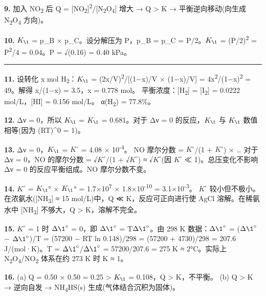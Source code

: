 \textbf{9.} 加入 NO\textsubscript{2} 后 Q = {[}NO\textsubscript{2}{]}\textsuperscript{2}/{[}N\textsubscript{2}O\textsubscript{4}{]} 增大 → Q \textgreater{} K → 平衡逆向移动(向生成 N\textsubscript{2}O\textsubscript{4} 方向)。

\textbf{10.} \(K_{\1}\) = p\_B × p\_C。设分解压为 P，p\_B = p\_C = P/2。\(K_{\1}\) = (P/2)\textsuperscript{2} = P\textsuperscript{2}/4 = 0.04。P = √(0.16) = 0.40 kPa。

\begin{center}\rule{0.5\linewidth}{0.5pt}\end{center}

\textbf{11.} 设转化 x mol H\textsubscript{2}：\(K_{\1}\) = (2x/V)\textsuperscript{2}/{[}(1−x)/V × (1−x)/V{]} = 4x\textsuperscript{2}/(1−x)\textsuperscript{2} = 49。解得 x/(1−x) = 3.5，x = 0.778 mol。
平衡浓度：{[}H\textsubscript{2}{]} = {[}I\textsubscript{2}{]} = 0.0222 mol/L，{[}HI{]} = 0.156 mol/L。
α(H\textsubscript{2}) = 77.8\%。

\textbf{12.} Δν = 0，所以 \(K_{\1}\) = \(K_{\1}\) = 0.681。对于 Δν = 0 的反应，\(K_{\1}\) 与 \(K_{\1}\) 数值相等(因为 (RT)\^{}0 = 1)。

\textbf{13.} Δν = 0，\(K_{\1}\) = \(K^{\circ}\) = 4.08 × 10\textsuperscript{-4}。
NO 摩尔分数 = \(K^{\circ}\)/(1 + \(K^{\circ}\)) × \ldots{} 对于 Δν = 0，NO 的摩尔分数 = √\(K^{\circ}\)/(1 + √\(K^{\circ}\)) ≈ √\(K^{\circ}\)(因 \(K^{\circ}\) ≪ 1)。总压变化不影响 Δν = 0 的反应平衡组成。NO 摩尔分数不变。

\textbf{14.} \(K^{\circ}\) = \(K_{\1}\)° × \(K_{\1}\)° = 1.7×10\textsuperscript{7} × 1.8×10\textsuperscript{-10} = 3.1×10\textsuperscript{-3}。
\(K^{\circ}\) 较小但不极小。在浓氨水({[}NH\textsubscript{3}{]} ≈ 15 mol/L)中，Q ≪ K，反应可正向进行使 AgCl 溶解。在稀氨水中 {[}NH\textsubscript{3}{]} 不够大，Q \textgreater{} K，溶解不完全。

\textbf{15.} \(K^{\circ}\) = 1 时 \(\Delta \1^{\circ}\) = 0，即 \(\Delta \1^{\circ}\) = T\(\Delta \1^{\circ}\)。由 298 K 数据：\(\Delta \1^{\circ}\) = (\(\Delta \1^{\circ}\) − \(\Delta \1^{\circ}\))/T = (57200 − RT ln 0.148)/298 = (57200 + 4730)/298 = 207.6 J/(mol·K)。T = \(\Delta \1^{\circ}\)/\(\Delta \1^{\circ}\) = 57200/207.6 = 275 K ≈ 2°C。实际上 N\textsubscript{2}O\textsubscript{4}/NO\textsubscript{2} 体系在约 273 K 时 K ≈ 1。

\textbf{16.}
(a) Q = 0.50 × 0.50 = 0.25 \textgreater{} \(K_{\1}\) = 0.108，Q \textgreater{} K，不平衡。
(b) Q \textgreater{} K → 逆向自发 → NH\textsubscript{4}HS(s) 生成(气体结合沉积为固体)。


